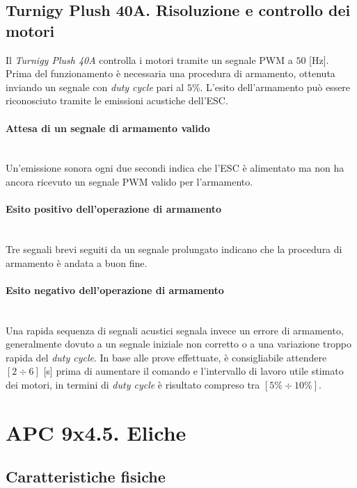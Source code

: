 \documentclass[11pt]{report}
\begin{document}
	\subsection{Turnigy Plush 40A. Risoluzione e controllo dei motori}
	\label{ESCRisoluzioneEControllo}
	Il \textit{Turnigy Plush 40A} controlla i motori tramite un segnale PWM a $50$ [Hz]. Prima del funzionamento è necessaria una procedura di armamento, ottenuta inviando un segnale con \textit{duty cycle} pari al $5\%$.
	L'esito dell'armamento può essere riconosciuto tramite le emissioni acustiche dell'ESC.
	
	\paragraph{\small{Attesa di un segnale di armamento valido}}\mbox{}\\
	Un'emissione sonora ogni due secondi indica che l'ESC è alimentato ma non ha ancora ricevuto un segnale PWM valido per l'armamento.
	
	\paragraph{\small{Esito positivo dell'operazione di armamento}}\mbox{}\\
	Tre segnali brevi seguiti da un segnale prolungato indicano che la procedura di armamento è andata a buon fine.
	
	\paragraph{\small{Esito negativo dell'operazione di armamento}}\mbox{}\\
	Una rapida sequenza di segnali acustici segnala invece un errore di armamento, generalmente dovuto a un segnale iniziale non corretto o a una variazione troppo rapida del \textit{duty cycle}. In base alle prove effettuate, è consigliabile attendere $[2\div6]$ [s] prima di aumentare il comando e l'intervallo di lavoro utile stimato dei motori, in termini di \textit{duty cycle} è risultato compreso tra $[5\%\div10\%]$.
	
	\section{APC 9x4.5. Eliche}
	\subsection{Caratteristiche fisiche}
	
\end{document}
